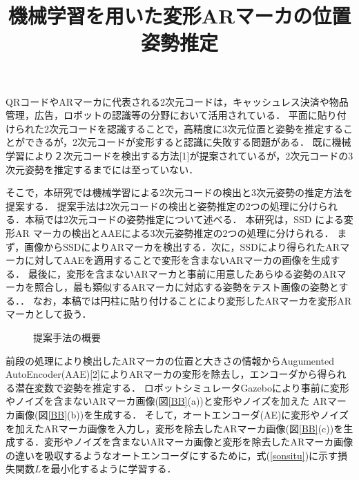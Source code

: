 \documentclass{jsarticle}
\title{機械学習を用いた変形ARマーカの位置姿勢推定}
\begin{document}
\maketitle

QRコードやARマーカに代表される2次元コードは，キャッシュレス決済や物品管理，広告，ロボットの認識等の分野において活用されている．
平面に貼り付けられた2次元コードを認識することで，高精度に3次元位置と姿勢を推定することができるが，2次元コードが変形すると認識に失敗する問題がある．
既に機械学習により２次元コードを検出する方法[1]が提案されているが，2次元コードの3次元姿勢を推定するまでには至っていない．

そこで，本研究では機械学習による2次元コードの検出と3次元姿勢の推定方法を提案する．
提案手法は2次元コードの検出と姿勢推定の2つの処理に分けられる．本稿では2次元コードの姿勢推定について述べる．
本研究は，SSD による変形AR マーカの検出とAAEによる3次元姿勢推定の2つの処理に分けられる．
まず，画像からSSDによりARマーカを検出する．次に，SSDにより得られたARマーカに対してAAEを適用することで変形を含まないARマーカの画像を生成する．
最後に，変形を含まないARマーカと事前に用意したあらゆる姿勢のARマーカを照合し，最も類似するARマーカに対応する姿勢をテスト画像の姿勢とする．．
なお，本稿では円柱に貼り付けることにより変形したARマーカを変形ARマーカとして扱う．

\begin{figure}[ht]
\vspace{-1zh}
\setlength{\epsfxsize}{7cm}
\centerline{}
\vspace{-2zh}
\caption{提案手法の概要}
\label{flow}
\vspace{-2zh}
\end{figure}

前段の処理により検出したARマーカの位置と大きさの情報からAugumented AutoEncoder(AAE)[2]によりARマーカの変形を除去し，エンコーダから得られる潜在変数で姿勢を推定する．
ロボットシミュレータGazeboにより事前に変形やノイズを含まないARマーカ画像(図\ref{BB}(a))と変形やノイズを加えた
ARマーカ画像(図\ref{BB}(b))を生成する．
そして，オートエンコーダ(AE)に変形やノイズを加えたARマーカ画像を入力し，変形を除去したARマーカ画像(図\ref{BB}(c))を生成する．変形やノイズを含まないARマーカ画像と変形を除去したARマーカ画像の違いを吸収するようなオートエンコーダにするために，式(\ref{sonsitu})に示す損失関数$L$を最小化するように学習する．
\end{document}
